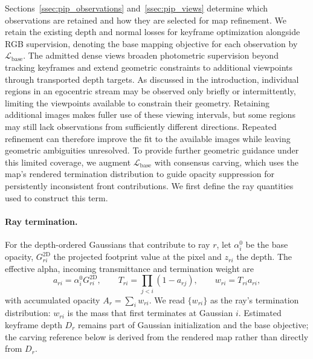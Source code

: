 Sections~\ref{ssec:pip_observations} and~\ref{ssec:pip_views} determine which observations are retained and how they are selected for map refinement.
We retain the existing depth and normal losses for keyframe optimization alongside RGB supervision, denoting the base mapping objective for each observation by $\mathcal L_{\mathrm{base}}$.
The admitted dense views broaden photometric supervision beyond tracking keyframes and extend geometric constraints to additional viewpoints through transported depth targets.
As discussed in the introduction, individual regions in an egocentric stream may be observed only briefly or intermittently, limiting the viewpoints available to constrain their geometry.
Retaining additional images makes fuller use of these viewing intervals, but some regions may still lack observations from sufficiently different directions.
Repeated refinement can therefore improve the fit to the available images while leaving geometric ambiguities unresolved.
To provide further geometric guidance under this limited coverage, we augment $\mathcal L_{\mathrm{base}}$ with consensus carving, which uses the map's rendered termination distribution to guide opacity suppression for persistently inconsistent front contributions.
We first define the ray quantities used to construct this term.

\paragraph{Ray termination.}
For the depth-ordered Gaussians that contribute to ray $r$, let $\alpha_i^0$ be the base opacity, $G_{ri}^{\mathrm{2D}}$ the projected
footprint value at the pixel and $z_{ri}$ the depth. The effective alpha, incoming transmittance and termination weight are
\begin{equation}\label{eq:ray_termination}
  a_{ri}=\alpha_i^0G_{ri}^{\mathrm{2D}},\qquad
  T_{ri}=\prod_{j<i}(1-a_{rj}),\qquad
  w_{ri}=T_{ri}a_{ri},
\end{equation}
with accumulated opacity $A_r=\sum_i w_{ri}$. We read $\{w_{ri}\}$ as the ray's termination distribution: $w_{ri}$ is the mass that first
terminates at Gaussian $i$. Estimated keyframe depth $D_r$ remains part of Gaussian initialization and the base objective;
the carving reference below is derived from the rendered map rather than directly from $D_r$.

